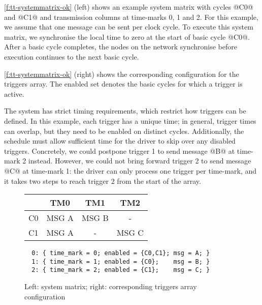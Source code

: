\autoref{f:tt-systemmatrix-ok} (left) shows an example system matrix with cycles @C0@ and @C1@ and transmission columns at time-marks 0, 1 and 2.
For this example, we assume that one message can be sent per clock cycle. %
To execute this system matrix, we synchronise the local time to zero at the start of basic cycle @C0@.
After a basic cycle completes, the nodes on the network synchronise before execution continues to the next basic cycle.

\autoref{f:tt-systemmatrix-ok} (right) shows the corresponding configuration for the triggers array.
The enabled set denotes the basic cycles for which a trigger is active.

The system has strict timing requirements, which restrict how triggers can be defined.
In this example, each trigger has a unique time; in general, trigger times can overlap, but they need to be enabled on distinct cycles.
Additionally, the schedule must allow sufficient time for the driver to skip over any disabled triggers.
Concretely, we could postpone trigger 1 to send message @B@ at time-mark 2 instead.
However, we could not bring forward trigger 2 to send message @C@ at time-mark 1: the driver can only process one trigger per time-mark, and it takes two steps to reach trigger 2 from the start of the array.

\begin{figure}
  \begin{minipage}{0.38\textwidth}
\begin{tabular}{r|ccc}
   & TM0 & TM1 & TM2 \\
  \hline
  C0 & MSG A & MSG B & - \\
  C1 & MSG A & - & MSG C
\end{tabular}
\end{minipage}
\begin{minipage}{0.6\textwidth}
\small
\begin{verbatim}
  0: { time_mark = 0; enabled = {C0,C1}; msg = A; }
  1: { time_mark = 1; enabled = {C0};    msg = B; }
  2: { time_mark = 2; enabled = {C1};    msg = C; }
\end{verbatim}
\end{minipage}
  
\caption{Left: system matrix; right: corresponding triggers array configuration}
\label{f:tt-systemmatrix-ok}
\end{figure}

